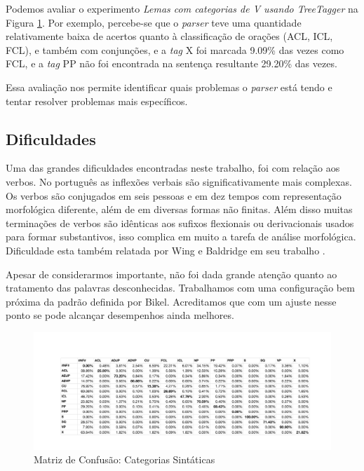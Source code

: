 Podemos avaliar o experimento \emph{Lemas com categorias de V usando TreeTagger} na Figura \ref{confusion_matrix_cat}. Por exemplo, percebe-se que o \emph{parser} teve uma quantidade relativamente baixa de acertos quanto à classificação de orações (ACL, ICL, FCL), e também com conjunções, e a \emph{tag} X foi marcada 9.09\% das vezes como FCL, e a \emph{tag} PP não foi encontrada na sentença resultante 29.20\% das vezes.

Essa avaliação nos permite identificar quais problemas o \emph{parser} está tendo e tentar resolver problemas mais específicos.

\subsection{Dificuldades}
\label{sec:dificuldades}

Uma das grandes dificuldades encontradas neste trabalho, foi com relação aos verbos. No português as inflexões verbais são significativamente mais complexas. Os verbos são conjugados em seis pessoas e em dez tempos com representação morfológica diferente, além de em diversas formas não finitas. Além disso muitas terminações de verbos são idênticas aos sufixos flexionais ou derivacionais usados para formar substantivos, isso complica em muito a tarefa de análise morfológica. Dificuldade esta também relatada por Wing e Baldridge em seu trabalho \cite{baldridge06}.

Apesar de considerarmos importante, não foi dada grande atenção quanto ao tratamento das palavras desconhecidas. Trabalhamos com uma configuração bem próxima da padrão definida por Bikel. Acreditamos que com um ajuste nesse ponto se pode alcançar desempenhos ainda melhores.

\begin{figure}
  \begin{center}
	\includegraphics[scale=0.65]{score_confusion_cat.pdf}
	\caption{\label{confusion_matrix_cat} Matriz de Confusão: Categorias Sintáticas}		
  \end{center}
\end{figure}
